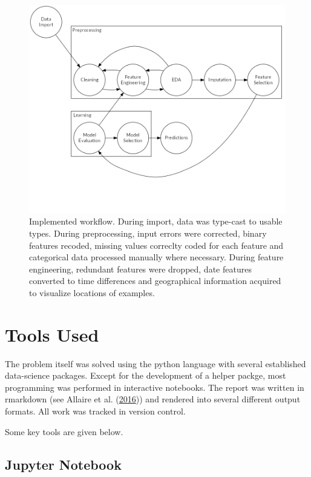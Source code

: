\documentclass[
  11pt,
  a4paper,
  DIV=12,captions=tableheading,oneside]{scrbook}
\begin{document}
\begin{figure}

{\centering \includegraphics[width=0.8\linewidth]{figures/preprocessing/workflow} 

}

\caption{Implemented workflow. During import, data was type-cast to usable types. During preprocessing, input errors were corrected, binary features recoded, missing values correclty coded for each feature and categorical data processed manually where necessary. During feature engineering, redundant features were dropped, date features converted to time differences and geographical information acquired to visualize locations of examples.}\label{fig:workflow}
\end{figure}

\hypertarget{tools-used}{%
\section{Tools Used}\label{tools-used}}

The problem itself was solved using the python language with several established data-science packages. Except for the development of a helper packge, most programming was performed in interactive notebooks. The report was written in rmarkdown (see Allaire et al. (\protect\hyperlink{ref-allaire2016rmarkdown}{2016})) and rendered into several different output formats. All work was tracked in version control.

Some key tools are given below.

\hypertarget{jupyter-notebook}{%
\subsection{Jupyter Notebook}\label{jupyter-notebook}}
\end{document}

